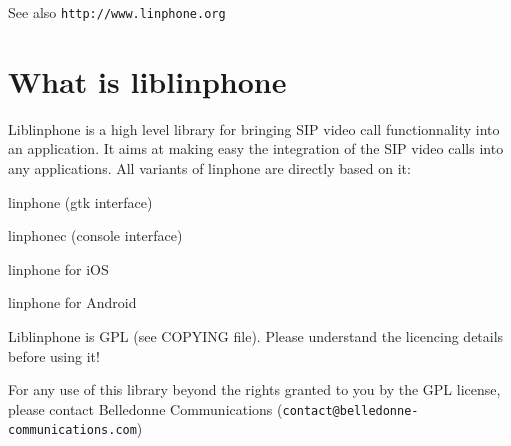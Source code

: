 \begin{DoxySeeAlso}{See also}
{\tt http\+://www.\+linphone.\+org}
\end{DoxySeeAlso}
\section{What is liblinphone}\label{index_what_is_it}
Liblinphone is a high level library for bringing S\+IP video call functionnality into an application. It aims at making easy the integration of the S\+IP video calls into any applications. All variants of linphone are directly based on it\+:
\begin{DoxyItemize}
\item linphone (gtk interface)
\item linphonec (console interface)
\item linphone for i\+OS
\item linphone for Android
\end{DoxyItemize}

Liblinphone is G\+PL (see C\+O\+P\+Y\+I\+NG file). Please understand the licencing details before using it!

For any use of this library beyond the rights granted to you by the G\+PL license, please contact Belledonne Communications ({\tt contact@belledonne-\/communications.\+com}) 